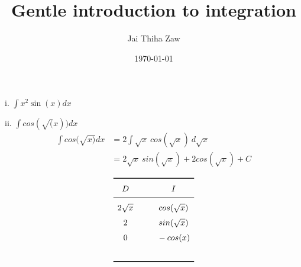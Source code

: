 \documentclass{article}
\title{Gentle introduction to integration}
\author{Jai Thiha Zaw}
\date{\today}
\newcommand{\tikzmark}[1]{%
	\tikz[overlay, remember picture, baseline] \node (#1) {};%
}
\begin{document}
	
	\maketitle
	
	
	

	
	i. $\int{x^2 \sin(x)}dx$ 
	
	

	
	
	ii. $\int{cos(\sqrt(x))}dx$ 
		\begin{align}  
		\int {cos(\sqrt{x)}} dx 
		&= 2 \int{\sqrt{x} \ cos(\sqrt{x})} \ d\sqrt{x} \\
		&= 2 \sqrt{x} \ sin(\sqrt{x}) + 2 cos(\sqrt{x}) + C 
	\end{align}
	
	\[
	\renewcommand{\arraystretch}{1.5}
	\begin{array}{c @{\hspace*{1.0cm}} c}\toprule
		D & I \\\cmidrule{1-2}
		2 \sqrt{x} \tikzmark{Left 1} & \tikzmark{Right 1}cos(\sqrt{x}) \\
		2 \tikzmark{Left 2} & \tikzmark{Right 2} sin(\sqrt{x}) \\      
		0 \tikzmark{Left 3} & \tikzmark{Right 3}-cos(x)\\      
\\\bottomrule
	\end{array}
	\]

	
	
\end{document}
